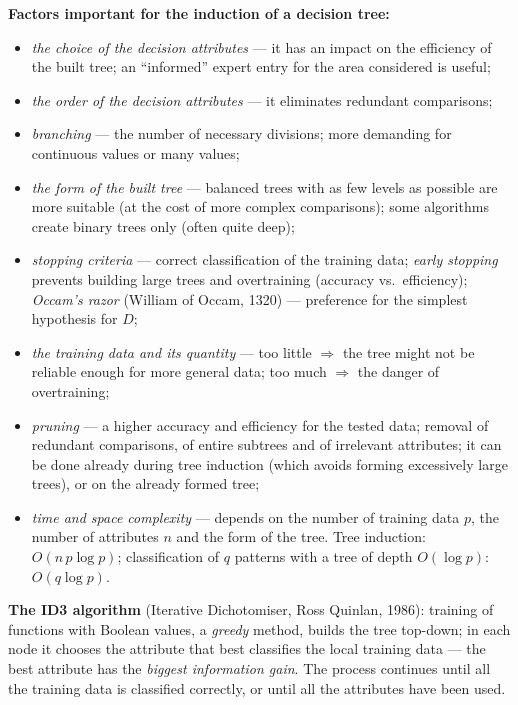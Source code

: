 \documentclass[11pt,a4paper]{article}
\theoremstyle{definition}
\providecommand{\uv}[1]{``#1''}
\begin{document}
\textbf{Factors important for the induction of a decision tree:}
\begin{itemize}
\item \emph{the choice of the decision attributes} --- it has an impact on the efficiency of the
      built tree; an \uv{informed} expert entry for the area considered is useful;
\item \emph{the order of the decision attributes} --- it eliminates redundant comparisons;
\item \emph{branching} --- the number of necessary divisions; more demanding for continuous values
      or many values;
\item \emph{the form of the built tree} --- balanced trees with as few levels as possible are more
      suitable (at the cost of more complex comparisons); some algorithms create binary trees
      only (often quite deep);
\item \emph{stopping criteria} --- correct classification of the training data; \emph{early
      stopping} prevents building large trees and overtraining (accuracy vs.\ efficiency);
      \emph{Occam's razor} (William of Occam, 1320) --- preference for the simplest hypothesis
      for $D$;
\item \emph{the training data and its quantity} --- too little $\Rightarrow$ the tree might not be
      reliable enough for more general data; too much $\Rightarrow$ the danger of overtraining;
\item \emph{pruning} --- a higher accuracy and efficiency for the tested data; removal of
      redundant comparisons, of entire subtrees and of irrelevant attributes; it can be done
      already during tree induction (which avoids forming excessively large trees), or on the
      already formed tree;
\item \emph{time and space complexity} --- depends on the number of training data $p$, the number
      of attributes $n$ and the form of the tree. Tree induction: $O(n\,p\log p)$; classification
      of $q$ patterns with a tree of depth $O(\log p)$: $O(q\log p)$.
\end{itemize}

\textbf{The ID3 algorithm} (Iterative Dichotomiser, Ross Quinlan, 1986): training of functions
with Boolean values, a \emph{greedy} method, builds the tree top-down; in each node it chooses the
attribute that best classifies the local training data --- the best attribute has the
\emph{biggest information gain}. The process continues until all the training data is classified
correctly, or until all the attributes have been used.
\end{document}
